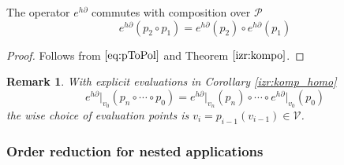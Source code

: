 \documentclass[smallcondensed]{svjour3}
\newcommand{\VV}{\mathcal{V}}
\newcommand{\dP}{\mathcal{P}}
\newcommand{\D}{\partial}
\newtheorem{opomba}{Remark}[section]
\begin{document}
   \begin{corollary}\label{izr:komp_homo}
   The operator $e^{h\D}$ commutes with composition over $\dP$
   \begin{equation}
   e^{h\D}(p_2\circ p_1)=e^{h\D}(p_2)\circ e^{h\D}(p_1)
   \end{equation}
   \end{corollary}
   
   \begin{proof}
   Follows from $\eqref{eq:pToPol}$ and Theorem $\ref{izr:kompo}$.
   \end{proof}
   
   \begin{opomba}
   With explicit evaluations in Corollary \ref{izr:komp_homo}
   \begin{equation}
   e^{h\D}\vert_{v_0}(p_n\circ\cdots\circ p_0)=e^{h\D}\vert_{v_n}(p_n)\circ\cdots\circ e^{h\D}\vert_{v_0}(p_0)
   \end{equation}
   the wise choice of evaluation points is $v_{i}=p_{i-1}(v_{i-1})\in \VV$.
   \end{opomba}
 
 \subsubsection{Order reduction for nested applications}\label{sec:orderReduction}
 
\end{document}
